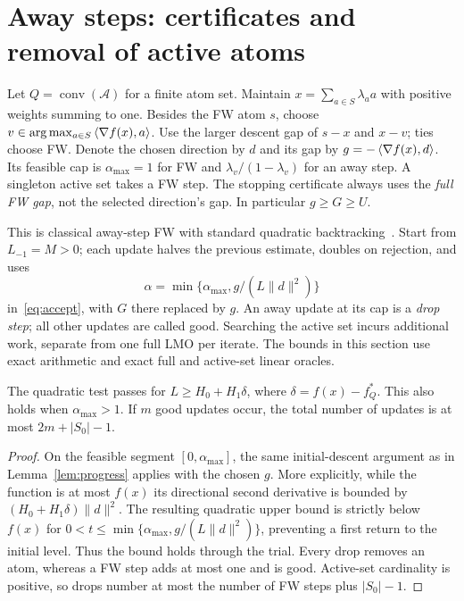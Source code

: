 \section{Away steps: certificates and removal of active atoms}
Let $Q=\operatorname{conv}(\mathcal A)$ for a finite atom set. Maintain
$x=\sum_{a\in S}\lambda_a a$ with positive weights summing to one.
Besides the FW atom $s$, choose $v\in\arg\max_{a\in S}\left\langle\nabla f(x),a\right\rangle$.
Use the larger descent gap of $s-x$ and $x-v$; ties choose FW. Denote the
chosen direction by $d$ and its gap by $g=-\left\langle\nabla f(x),d\right\rangle$.
Its feasible cap is $\alpha_{\max}=1$ for FW and
$\lambda_v/(1-\lambda_v)$ for an away step. A singleton active set takes
a FW step. The stopping certificate always uses the \emph{full FW gap},
not the selected direction's gap. In particular $g\ge G\ge U$.

This is classical away-step FW with standard quadratic
backtracking~\cite{lacostejaggi,pedregosa}. Start from $L_{-1}=M>0$;
each update halves the previous estimate, doubles on rejection, and
uses
\[
 \alpha=\min\{\alpha_{\max},g/(L\|d\|^2)\}
\]
in~\eqref{eq:accept}, with $G$ there replaced by $g$.
An away update at its cap is a \emph{drop step}; all other updates are
called good. Searching the active set incurs additional work, separate
from one full LMO per iterate.
The bounds in this section use exact arithmetic and exact full and
active-set linear oracles.

\begin{lemma}\label{lem:away}
The quadratic test passes for $L\ge H_0+H_1\delta$, where
$\delta=f(x)-f_Q^*$. This also holds when $\alpha_{\max}>1$.
If $m$ good updates occur, the total number of updates is at most
$2m+|S_0|-1$.
\end{lemma}
\begin{proof}
On the feasible segment $[0,\alpha_{\max}]$, the same initial-descent
argument as in Lemma~\ref{lem:progress} applies with the chosen $g$.
More explicitly, while the function is at most $f(x)$ its directional
second derivative is bounded by $(H_0+H_1\delta)\|d\|^2$.
The resulting quadratic upper bound is strictly below $f(x)$ for
$0<t\le\min\{\alpha_{\max},g/(L\|d\|^2)\}$, preventing a first
return to the initial level. Thus the bound holds through the trial.
Every drop removes an atom, whereas a FW step adds at most one and is
good. Active-set cardinality is positive, so drops number at most the
number of FW steps plus $|S_0|-1$.
\end{proof}

